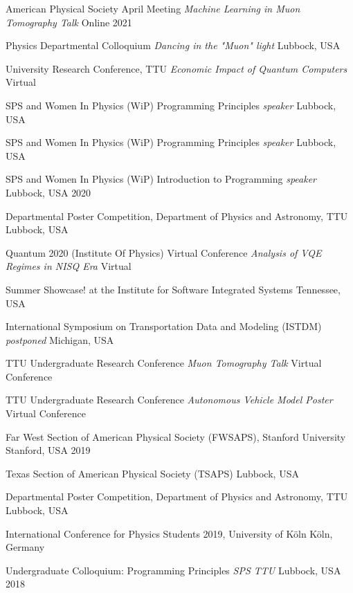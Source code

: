 
\begin{cvhonors}

    \cvhonor
    {American Physical Society April Meeting}
    {\textit{\scriptsize Machine Learning in Muon Tomography Talk}}
    {Online}
    {2021}

    \cvhonor
    {Physics Departmental Colloquium}
    {\textit{\scriptsize Dancing in the "Muon" light}}
    {Lubbock, USA}
    {}

    \cvhonor
    {University Research Conference, TTU}
    {\textit{\scriptsize Economic Impact of Quantum Computers}}
    {Virtual}
    {}

    \cvhonor
    {SPS and Women In Physics (WiP) Programming Principles}
    {\textit{\scriptsize speaker}}
    {Lubbock, USA}
    {}

    \cvhonor
    {SPS and Women In Physics (WiP) Programming Principles}
    {\textit{\scriptsize speaker}}
    {Lubbock, USA}
    {}


    \cvhonor
    {SPS and Women In Physics (WiP) Introduction to Programming}
    {\textit{\scriptsize speaker}}
    {Lubbock, USA}
    {2020}


    \cvhonor
    {Departmental Poster Competition, Department of Physics and Astronomy, TTU}
    {}
    {Lubbock, USA}
    {}


    \cvhonor
    {Quantum 2020 (Institute Of Physics) Virtual Conference}
    {\textit{\scriptsize Analysis of VQE Regimes in NISQ Era}}
    {Virtual}
    {}

    
    \cvhonor
    {Summer Showcase! at the Institute for Software Integrated Systems}
    {}
    {Tennessee, USA}
    {}

    \cvhonor
    { International Symposium on Transportation Data and Modeling (ISTDM)}
    {\textit{\scriptsize postponed}}
    {Michigan, USA}
    {}

    \cvhonor
    {TTU Undergraduate Research Conference}
    {\textit{\scriptsize Muon Tomography Talk}}
    {Virtual Conference}
    {}

    \cvhonor
    {TTU Undergraduate Research Conference}
    {\textit{\scriptsize Autonomous Vehicle Model Poster}}
    {Virtual Conference}
    {}

    \cvhonor
    {Far West Section of American Physical Society (FWSAPS), Stanford University}
    {}
    {Stanford, USA}
    {2019}

    \cvhonor
    {Texas Section of American Physical Society (TSAPS)}
    {}
    {Lubbock, USA}
    {}

    \cvhonor
    {Departmental Poster Competition, Department of Physics and Astronomy, TTU}
    {}
    {Lubbock, USA}
    {}

    \cvhonor
    {International Conference for Physics Students 2019, University of Köln}
    {}
    {Köln, Germany}
    {}

    \cvhonor
    {Undergraduate Colloquium: Programming Principles}
    {\textit{\scriptsize SPS TTU}}
    {Lubbock, USA}
    {2018}

\end{cvhonors}
